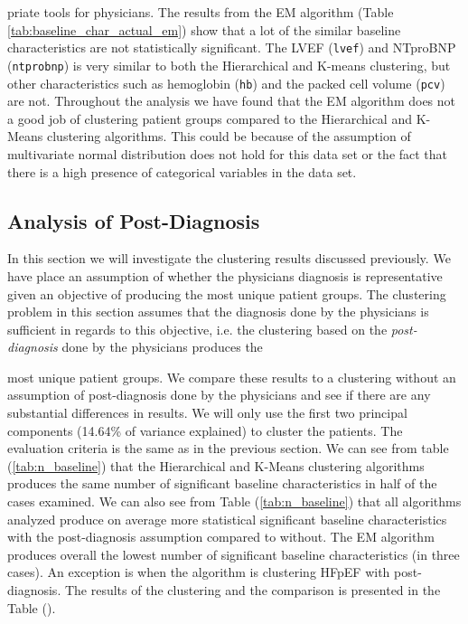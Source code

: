 \documentclass[../thesis.tex]{subfiles}
\begin{document}


\noindent priate tools for physicians. The results from the EM algorithm (Table \ref{tab:baseline_char_actual_em}) show that a lot of the similar baseline characteristics are not statistically significant. The LVEF (\texttt{lvef}) and NTproBNP (\texttt{ntprobnp}) is very similar to both the Hierarchical and K-means clustering, but other characteristics such as hemoglobin (\texttt{hb}) and the packed cell volume (\texttt{pcv}) are not. Throughout the analysis we have found that the EM algorithm does not a good job of clustering patient groups compared to the Hierarchical and K-Means clustering algorithms. This could be because of the assumption of multivariate normal distribution does not hold for this data set or the fact that there is a high presence of categorical variables in the data set.

\subsection{Analysis of Post-Diagnosis}

\noindent In this section we will investigate the clustering results discussed previously. We have place an assumption of whether the physicians diagnosis is representative given an objective of producing the most unique patient groups. The clustering problem in this section assumes that the diagnosis done by the physicians is sufficient in regards to this objective, i.e. the clustering based on the \textit{post-diagnosis} done by the physicians produces the  



\noindent most unique patient groups. We compare these results to a clustering without an assumption of post-diagnosis done by the physicians and see if there are any substantial differences in results. We will only use the first two principal components (14.64\% of variance explained) to cluster the patients. The evaluation criteria is the same as in the previous section. We can see from table (\ref{tab:n_baseline}) that the Hierarchical and K-Means clustering algorithms produces the same number of significant baseline characteristics in half of the cases examined.  We can also see from Table (\ref{tab:n_baseline}) that all algorithms analyzed produce on average more statistical significant baseline characteristics with the post-diagnosis assumption compared to without. The EM algorithm produces overall the lowest number of significant baseline characteristics (in three cases). An exception is when the algorithm is clustering HFpEF with post-diagnosis. The results of the clustering and the comparison is presented in the Table ().\\
\end{document}
